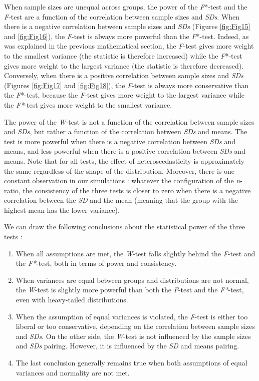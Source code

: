 \documentclass[
  english,
  man]{apa6}
\providecommand{\tightlist}{%
  \setlength{\itemsep}{0pt}\setlength{\parskip}{0pt}}
\begin{document}
When sample sizes are unequal across groups, the power of the \emph{F}*-test and the \emph{F}-test are a function of the correlation between sample sizes and \emph{SDs}. When there is a negative correlation between sample sizes and \emph{SDs} (Figures \ref{fig:Fig15} and \ref{fig:Fig16}), the \emph{F}-test is always more powerful than the \emph{F}*-test. Indeed, as was explained in the previous mathematical section, the \emph{F}-test gives more weight to the smallest variance (the statistic is therefore increased) while the \emph{F}*-test gives more weight to the largest variance (the statistic is therefore decreased). Conversely, when there is a positive correlation between sample sizes and \emph{SDs} (Figures \ref{fig:Fig17} and \ref{fig:Fig18}), the \emph{F}-test is always more conservative than the \emph{F}*-test, because the \emph{F}-test gives more weight to the largest variance while the \emph{F*}-test gives more weight to the smallest variance.

The power of the \emph{W}-test is not a function of the correlation between sample sizes and \emph{SDs}, but rather a function of the correlation between \emph{SDs} and means. The test is more powerful when there is a negative correlation between \emph{SDs} and means, and less powerful when there is a positive correlation between \emph{SDs} and means. Note that for all tests, the effect of heteroscedasticity is approximately the same regardless of the shape of the distribution. Moreover, there is one constant observation in our simulations : whatever the configuration of the \emph{n}-ratio, the consistency of the three tests is closer to zero when there is a negative correlation between the \emph{SD} and the mean (meaning that the group with the highest mean has the lower variance).

We can draw the following conclusions about the statistical power of the three tests :

\begin{enumerate}
\def\labelenumi{\arabic{enumi})}
\tightlist
\item
  When all assumptions are met, the \emph{W}-test falls slightly behind the \emph{F}-test and the \emph{F*}-test, both in terms of power and consistency.
\item
  When variances are equal between groups and distributions are not normal, the \emph{W}-test is slightly more powerful than both the \emph{F}-test and the \emph{F*}-test, even with heavy-tailed distributions.
\item
  When the assumption of equal variances is violated, the \emph{F}-test is either too liberal or too conservative, depending on the correlation between sample sizes and \emph{SDs}. On the other side, the \emph{W}-test is not influenced by the sample sizes and \emph{SDs} pairing. However, it is influenced by the \emph{SD} and means pairing.
\item
  The last conclusion generally remains true when both assumptions of equal variances and normality are not met.
\end{enumerate}
\end{document}

